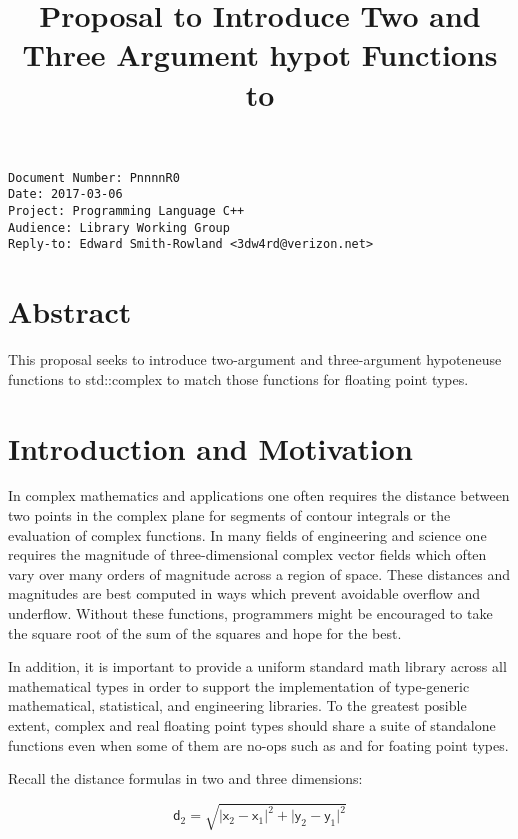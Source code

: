 \documentclass[ebook,10pt,oneside,openany,final]{memoir}
\title{Proposal to Introduce Two and Three Argument hypot Functions to \tcode{<complex>}}
\author{}
\date{}
\begin{document}
\pagestyle{cpppage}

\maketitle

\begin{verbatim}
Document Number: PnnnnR0
Date: 2017-03-06
Project: Programming Language C++
Audience: Library Working Group
Reply-to: Edward Smith-Rowland <3dw4rd@verizon.net>
\end{verbatim}

\section{Abstract}

This proposal seeks to introduce two-argument and three-argument hypoteneuse functions
to std::complex to match those functions for floating point types.

\section{Introduction and Motivation}

In complex mathematics and applications one often requires the distance between two points in the complex plane
for segments of contour integrals or the evaluation of complex functions.  In many fields of engineering and science
one requires the magnitude of three-dimensional complex vector fields which often vary over many orders of magnitude across
a region of space.  These distances and magnitudes are best computed in ways which prevent avoidable overflow and underflow.
Without these functions, programmers might be encouraged to take the square root of the sum of the squares and hope
for the best.

In addition, it is important to provide a uniform standard math library across all mathematical types in order to support
the implementation of type-generic mathematical, statistical, and engineering libraries.  To the greatest posible extent,
complex and real floating point types should share a suite of standalone functions even when some of them are no-ops
such as  and  for foating point types.

Recall the distance formulas in two and three dimensions:

\[%
\mathsf{d}_2 = \sqrt{\lvert\mathsf{x}_2 - \mathsf{x}_1\rvert^2
                   + \lvert\mathsf{y}_2 - \mathsf{y}_1\rvert^2}
\]
\end{document}
